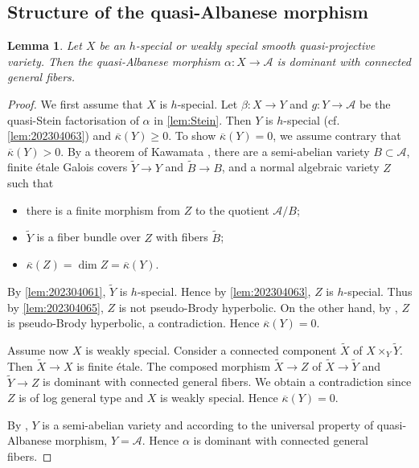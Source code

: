 \documentclass[11pt,english]{smfart}
\theoremstyle{plain}
\newtheorem{lem}[thm]{Lemma}
\theoremstyle{definition}
\theoremstyle{remark}
\numberwithin{equation}{subsection}
\theoremstyle{plain}
\newcommand{\cA}{\mathcal A}
\begin{document}
\subsection{Structure of the quasi-Albanese morphism}\label{sec:qA}






\begin{lem}\label{prop:factor}
	Let $X$ be an $h$-special or weakly special smooth quasi-projective variety.  Then  the quasi-Albanese morphism $\alpha:X\to \cA$ is dominant with connected general fibers. 
\end{lem}
\begin{proof} 
	
	
	
	
We first assume that $X$ is $h$-special.
	Let $\beta:X\to Y$  and $g:Y\to \cA$ be the quasi-Stein factorisation of $\alpha$ in \cref{lem:Stein}. 
Then $Y$ is $h$-special (cf. \cref{lem:202304063}) and  $\overline{\kappa}(Y)\geq 0$. 
To show $\overline{\kappa}(Y)=0$, we assume contrary that $\overline{\kappa}(Y)>0$.  By a theorem of Kawamata \cite[Theorem 27]{Kaw81},  there are a semi-abelian variety $B\subset \cA$,   finite \'etale Galois covers $\widetilde{Y}\to Y$ and $\widetilde{B}\to B$, and a normal algebraic variety $Z$ such that
	\begin{itemize}
		\item there is a finite morphism from $Z$ to the quotient $\cA/B$;
		\item  $\widetilde{Y}$ is a fiber bundle over $Z$ with fibers $\widetilde{B}$;
		\item $\overline{\kappa}(Z)=\dim Z=\overline{\kappa}(Y)$.
	\end{itemize} 	  
By \cref{lem:202304061}, $\widetilde{Y}$ is $h$-special.
Hence by \cref{lem:202304063}, $Z$ is $h$-special.
Thus by \cref{lem:202304065}, $Z$ is not pseudo-Brody hyperbolic.
On the other hand, by \cite[Theorem C]{CDY25}, $Z$ is pseudo-Brody hyperbolic, a contradiction. 
Hence $\overline{\kappa}(Y)=0$.
	
	
	Assume now $X$ is weakly special.  Consider a connected component $\widetilde{X}$ of $X\times_Y\widetilde{Y}$. Then $\widetilde{X}\to  X$ is finite \'etale.  The composed morphism $\widetilde{X}\to Z$ of $\widetilde{X}\to \widetilde{Y}$ and $\widetilde{Y}\to Z$ is dominant with connected general fibers. We obtain a contradiction since $Z$ is of log general type and $X$ is weakly special. Hence $\overline{\kappa}(Y)=0$. 
	
	By \cite[Theorem 26]{Kaw81}, $Y$ is a semi-abelian variety and according to the universal property of quasi-Albanese morphism, $Y=\cA$. Hence $\alpha$ is dominant with  connected general fibers.  
\end{proof}  
\end{document}
